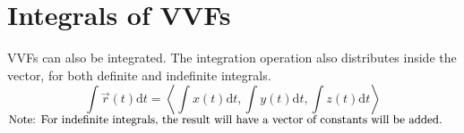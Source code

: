 \section{Integrals of VVFs}
VVFs can also be integrated. The integration operation also distributes inside the vector, for both definite and indefinite integrals.
\begin{equation*}
	\int{\vec{r}(t)\mathrm{d}t} = \left<\int{x(t)\mathrm{d}t},\int{y(t)\mathrm{d}t},\int{z(t)\mathrm{d}t}\right>
\end{equation*}
$\small{\text{Note: For indefinite integrals, the result will have a vector of constants will be added.}}$